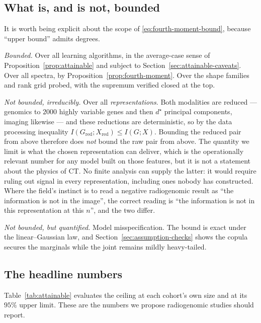 \documentclass{article}
\begin{document}
\subsection{What is, and is not, bounded}
\label{sec:attainable-scope}

It is worth being explicit about the scope of \eqref{eq:fourth-moment-bound},
because ``upper bound'' admits degrees.

\emph{Bounded.} Over all learning algorithms, in the average-case sense of
Proposition~\ref{prop:attainable} and subject to
Section~\ref{sec:attainable-caveats}. Over all spectra, by
Proposition~\ref{prop:fourth-moment}. Over the shape families and rank grid
probed, with the supremum verified closed at the top.

\emph{Not bounded, irreducibly.} Over all \emph{representations}. Both
modalities are reduced --- genomics to $2000$ highly variable genes and then
$d^\star$ principal components, imaging likewise --- and these reductions are
deterministic, so by the data processing inequality
$I(G_{\mathrm{red}};X_{\mathrm{red}}) \le I(G;X)$. Bounding the reduced pair
from above therefore does \emph{not} bound the raw pair from above. The quantity
we limit is what the chosen representation can deliver, which is the
operationally relevant number for any model built on those features, but it is
not a statement about the physics of CT. No finite analysis can supply the
latter: it would require ruling out signal in every representation, including
ones nobody has constructed. Where the field's instinct is to read a negative
radiogenomic result as ``the information is not in the image'', the correct
reading is ``the information is not in this representation at this $n$'', and
the two differ.

\emph{Not bounded, but quantified.} Model misspecification. The bound is exact
under the linear--Gaussian law, and Section~\ref{sec:assumption-checks} shows the
copula secures the marginals while the joint remains mildly heavy-tailed.

\subsection{The headline numbers}
\label{sec:attainable-headline}

Table~\ref{tab:attainable} evaluates the ceiling at each cohort's own size and
at its $95\%$ upper limit. These are the numbers we propose radiogenomic studies
should report.
\end{document}
